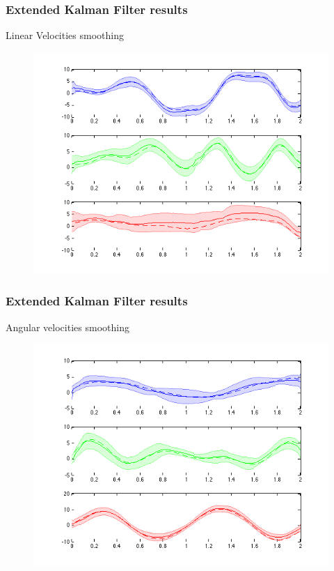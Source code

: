 \documentclass[xcolor=dvipsnames]{beamer}
\begin{document}
\begin{frame}
  \frametitle{Extended Kalman Filter results}
  Linear Velocities smoothing
\begin{figure} 
  \centering 
	  \includegraphics[height=0.70\hsize]{images/png/linVel.png} 
\end{figure}
\end{frame}

\begin{frame}
  \frametitle{Extended Kalman Filter results}
   Angular velocities smoothing
\begin{figure} 
  \centering 
	  \includegraphics[height=0.70\hsize]{images/png/angVel.png} 
\end{figure}
\end{frame}
\end{document}
